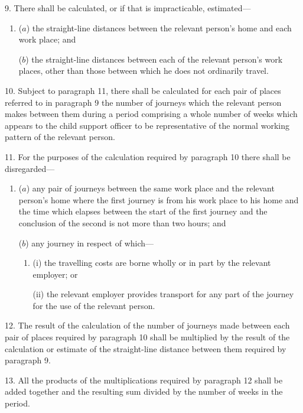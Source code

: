 \documentclass[12pt,a4paper]{article}
\begin{document}
\medskip

9.  There shall be calculated, or if that is impracticable, estimated—
\begin{enumerate}\item[]
($a$) the straight-line distances between the relevant person’s home and each work place; and

($b$) the straight-line distances between each of the relevant person’s work places, other than those between which he does not ordinarily travel.
\end{enumerate}

\medskip

10.  Subject to paragraph 11, there shall be calculated for each pair of places referred to in paragraph 9 the number of journeys which the relevant person makes between them during a period comprising a whole number of weeks which appears to the child support officer to be representative of the normal working pattern of the relevant person.

\medskip

11.  For the purposes of the calculation required by paragraph 10 there shall be disregarded—
\begin{enumerate}\item[]
($a$) any pair of journeys between the same work place and the relevant person’s home where the first journey is from his work place to his home and the time which elapses between the start of the first journey and the conclusion of the second is not more than two hours; and

($b$) any journey in respect of which—
\begin{enumerate}\item[]
(i) the travelling costs are borne wholly or in part by the relevant employer; or

(ii) the relevant employer provides transport for any part of the journey for the use of the relevant person.
\end{enumerate}
\end{enumerate}

\medskip

12.  The result of the calculation of the number of journeys made between each pair of places required by paragraph 10 shall be multiplied by the result of the calculation or estimate of the straight-line distance between them required by paragraph 9.

\medskip

13.  All the products of the multiplications required by paragraph 12 shall be added together and the resulting sum divided by the number of weeks in the period.
\end{document}

